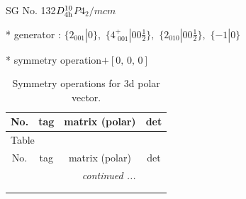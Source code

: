 \documentclass[fleqn,8pt]{jsarticle}
\begin{document}
\setcounter{MaxMatrixCols}{32}

\renewcommand{\tablename}{Table~}
\renewcommand{\figurename}{Figure~}
\begin{center}
\LARGE
SG No. 132\quad$D_{\rm 4h}^{10}$\quad$P4_2/mcm$\quad[ tetragonal ]
\end{center}

* generator : $\{2{}_{001}|0\},\,\,\{4^{+}_{\,\,001}|0 0 \frac{1}{2}\},\,\,\{2{}_{010}|0 0 \frac{1}{2}\},\,\,\{-1|0\}$

* symmetry operation\quad$+\left[ 0,\, 0,\, 0 \right]$
\renewcommand{\arraystretch}{1.3}
\begin{longtable}{cccc}
\caption{Symmetry operations for 3d polar vector.}
 \\
 \hline \hline
No. & tag & matrix (polar) & det \\ \hline \endfirsthead

\multicolumn{3}{l}{\tablename\ \thetable{}} \\
 \hline \hline
No. & tag & matrix (polar) & det \\ \hline \endhead

 \hline \hline
\multicolumn{3}{r}{\footnotesize\it continued ...} \\ \endfoot

 \hline \hline
\multicolumn{3}{r}{} \\ \endlastfoot


\end{longtable}
\end{document}
